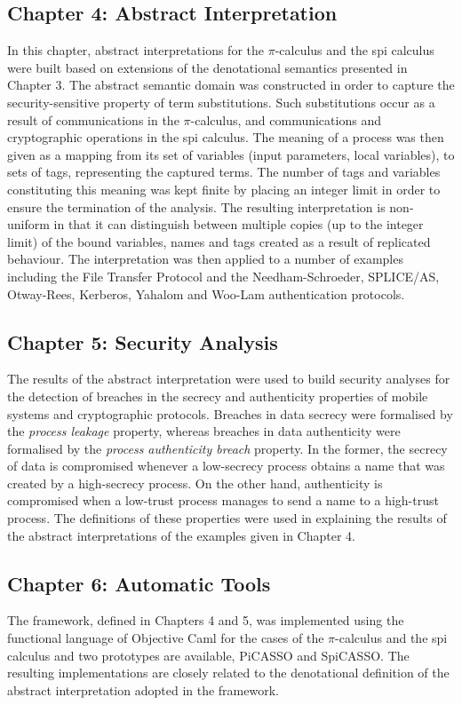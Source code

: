 \documentclass[10pt,a4paper,final,oneside,fleqn]{book}
\begin{document}
\subsection*{Chapter 4: Abstract Interpretation}
In this chapter, abstract interpretations for the $\pi$-calculus and the spi calculus were built based on extensions of the denotational semantics presented in Chapter 3.  The abstract semantic domain was constructed in order to capture the security-sensitive property of term substitutions.  Such substitutions occur as a result of communications in the $\pi$-calculus, and communications and cryptographic operations in the spi calculus.  The meaning of a process was then given as a mapping from its set of variables (input parameters, local variables), to sets of tags, representing the captured terms.
The number of tags and variables constituting this meaning was kept finite by placing an integer limit in order to ensure the termination of the analysis.  The resulting interpretation is non-uniform in that it can distinguish between multiple copies (up to the integer limit) of the bound variables, names and tags created as a result of replicated behaviour. The interpretation was then applied to a number of examples including the File Transfer Protocol and the Needham-Schroeder, SPLICE/AS, Otway-Rees, Kerberos, Yahalom and Woo-Lam authentication protocols.
\subsection*{Chapter 5: Security Analysis}
The results of the abstract interpretation were used to build security analyses for the detection of breaches in the secrecy and authenticity properties of mobile systems and cryptographic protocols.  Breaches in data secrecy were formalised by the {\itshape process leakage\/} property, whereas breaches in data authenticity were formalised by the {\itshape process authenticity breach\/} property.  In the former, the secrecy of data is compromised whenever a low-secrecy process obtains a name that was created by a high-secrecy process.  On the other hand, authenticity is compromised when a low-trust process manages to send a name to a high-trust process.  The definitions of these properties were used in explaining the results of the abstract interpretations of the examples given in Chapter 4.
\subsection*{Chapter 6: Automatic Tools}
The framework, defined in Chapters 4 and 5, was implemented using the functional language of Objective Caml for the cases of the $\pi$-calculus and the spi calculus and two prototypes are available, PiCASSO and SpiCASSO.  The resulting implementations are closely related to the denotational definition of the abstract interpretation adopted in the framework.
\end{document}
